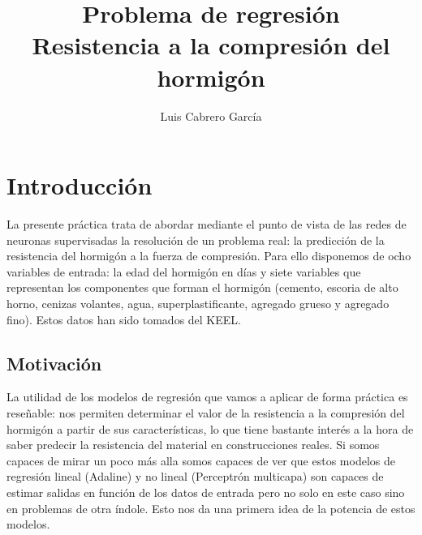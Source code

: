 \documentclass[11pt,spanish,listoffigures,listoftables]{tfgetsinf}
\title{Problema de regresión \\
         Resistencia a la compresión del hormigón}
\author{Luis Cabrero García}
\begin{document}

\makeindexes


\mainmatter


\chapter{Introducci\'on}

\par La presente práctica trata de abordar mediante el punto de vista de las redes de neuronas supervisadas la resolución de un problema real: la predicción de la resistencia del hormigón a la fuerza de compresión. Para ello disponemos de ocho variables de entrada: la edad del hormigón en días y siete variables que representan los componentes que forman el hormigón (cemento, escoria de alto horno, cenizas volantes, agua, superplastificante, agregado grueso y agregado fino). Estos datos han sido tomados del KEEL\cite{KEEL}.

\section{Motivaci\'on}

\par La utilidad de los modelos de regresión que vamos a aplicar de forma práctica es reseñable: nos permiten determinar el valor de la resistencia a la compresión del hormigón a partir de sus características, lo que tiene bastante interés a la hora de saber predecir la resistencia del material en construcciones reales. Si somos capaces de mirar un poco más alla somos capaces de ver que estos modelos de regresión lineal (Adaline) y no lineal (Perceptrón multicapa) son capaces de estimar salidas en función de los datos de entrada pero no solo en este caso sino en problemas de otra índole. Esto nos da una primera idea de la potencia de estos modelos.
\end{document}

